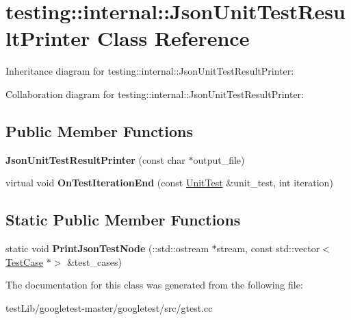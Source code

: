 \hypertarget{classtesting_1_1internal_1_1JsonUnitTestResultPrinter}{}\section{testing\+:\+:internal\+:\+:Json\+Unit\+Test\+Result\+Printer Class Reference}
\label{classtesting_1_1internal_1_1JsonUnitTestResultPrinter}


Inheritance diagram for testing\+:\+:internal\+:\+:Json\+Unit\+Test\+Result\+Printer\+:


Collaboration diagram for testing\+:\+:internal\+:\+:Json\+Unit\+Test\+Result\+Printer\+:
\subsection*{Public Member Functions}
\begin{DoxyCompactItemize}
\item 
\mbox{\label{classtesting_1_1internal_1_1JsonUnitTestResultPrinter_a273623decde1be18db45e95594f9d501}} 
{\bfseries Json\+Unit\+Test\+Result\+Printer} (const char $\ast$output\+\_\+file)
\item 
\mbox{\label{classtesting_1_1internal_1_1JsonUnitTestResultPrinter_a44edb54cf1ab8cdcd56bda5058b8f1d6}} 
virtual void {\bfseries On\+Test\+Iteration\+End} (const \hyperlink{classtesting_1_1UnitTest}{Unit\+Test} \&unit\+\_\+test, int iteration)
\end{DoxyCompactItemize}
\subsection*{Static Public Member Functions}
\begin{DoxyCompactItemize}
\item 
\mbox{\label{classtesting_1_1internal_1_1JsonUnitTestResultPrinter_a5f2b7e7c90cbdd2029ddaa6c1ad75de0}} 
static void {\bfseries Print\+Json\+Test\+Node} (\+::std\+::ostream $\ast$stream, const std\+::vector$<$ \hyperlink{classtesting_1_1TestCase}{Test\+Case} $\ast$$>$ \&test\+\_\+cases)
\end{DoxyCompactItemize}


The documentation for this class was generated from the following file\+:\begin{DoxyCompactItemize}
\item 
test\+Lib/googletest-\/master/googletest/src/gtest.\+cc\end{DoxyCompactItemize}

